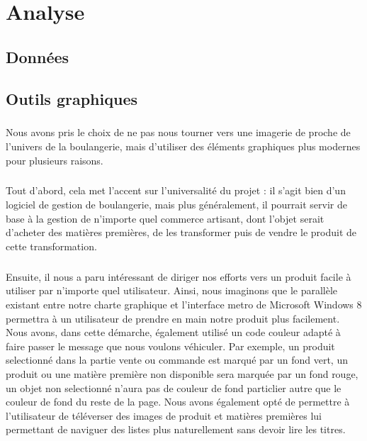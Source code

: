 \chapter{Analyse}

\section{Données}

\section{Outils graphiques}
    \paragraph{}
        Nous avons pris le choix de ne pas nous tourner vers une imagerie de
        proche de l'univers de la boulangerie, mais d'utiliser des éléments
        graphiques plus modernes pour plusieurs raisons.
    \paragraph{}
        Tout d'abord, cela met l'accent sur l'universalité du projet :
        il s'agit bien d'un logiciel de gestion de boulangerie, mais plus
        généralement, il pourrait servir de base à la gestion de n'importe
        quel commerce artisant, dont l'objet serait d'acheter des matières
        premières, de les transformer puis de vendre le produit de cette
        transformation.
    \paragraph{}
        Ensuite, il nous a paru intéressant de diriger nos efforts vers un
        produit facile à utiliser par n'importe quel utilisateur.
        Ainsi, nous imaginons que le parallèle existant entre notre charte
        graphique et l'interface metro de Microsoft Windows 8 permettra à un
        utilisateur de prendre en main notre produit plus facilement.
        Nous avons, dans cette démarche, également utilisé un code couleur
        adapté à faire passer le message que nous voulons véhiculer.
        Par exemple, un produit selectionné dans la partie vente ou commande
        est marqué par un fond vert, un produit ou une matière première non
        disponible sera marquée par un fond rouge, un objet non selectionné
        n'aura pas de couleur de fond particlier autre que le couleur de fond
        du reste de la page.
        Nous avons également opté de permettre à l'utilisateur de téléverser
        des images de produit et matières premières lui permettant de naviguer
        des listes plus naturellement sans devoir lire les titres.